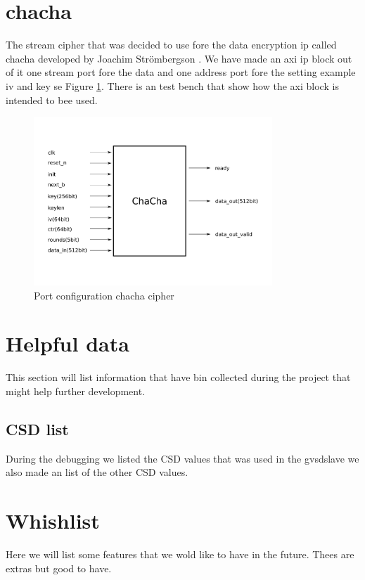 \documentclass[]{article}
\begin{document}
\section{chacha}
The stream cipher that was decided to use fore the data encryption ip called chacha \cite{chacha} developed by Joachim Strömbergson \cite{joachim}.  
We have made an axi ip block out of it one stream port fore the data and one address port fore the setting example iv and key se Figure \ref{fig:chacha}.
There is an test bench that show how the axi block is intended to bee used.

\begin{figure}[h]
	\centering
	\includegraphics[width=0.8\textwidth]{ilustrations/chacha.pdf}
	\caption{Port configuration chacha cipher}
	\label{fig:chacha}
\end{figure}


\section{Helpful data}
This section will list information that have bin collected during the project that might help further development.

\subsection{CSD list}
During the debugging we listed the CSD values that was used in the \gls{gvsdslave} we also made an list of the other CSD values.

\section{Whishlist}
Here we will list some features that we wold like to have in the future.
Thees are extras but good to have.
\end{document}
